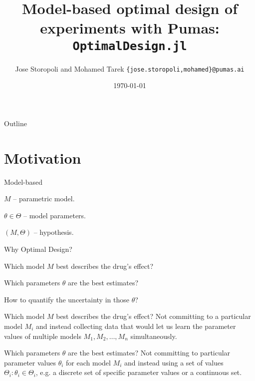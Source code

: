\documentclass[aspectratio=169]{beamer}                    %
\title[\texttt{OptimalDesign.jl}]{Model-based optimal design of experiments with Pumas: \texttt{OptimalDesign.jl}}
\author[\textcolor{pureminimalistic@text@pumasblue}{PumasAI}]{Jose Storopoli and Mohamed Tarek \texttt{\{jose.storopoli,mohamed\}@pumas.ai}}
\institute{\textcolor{pureminimalistic@text@pumasblue}{PumasAI}}
\date{\today}
\begin{document}
\maketitle
\nocite{*}

\begin{frame}{Outline}
	\tableofcontents
\end{frame}

\section{Motivation}
\begin{frame}{Model-based}
	\begin{vfilleditems}
		\item $M$ -- parametric model.
		\item $\theta \in \Theta$ -- model parameters.
		\item $(M, \Theta)$ -- hypothesis.
	\end{vfilleditems}
\end{frame}

\begin{frame}{Why Optimal Design?}
	\begin{vfilleditems}
		\item Which model $M$ best describes the drug's effect?
		\item Which parameters $\theta$ are the best estimates?
		\item How to quantify the uncertainty in those $\theta$?
	\end{vfilleditems}
\end{frame}

\begin{frame}{Which model $M$ best describes the drug's effect?}
	Not committing to a particular model $M_i$ and instead collecting data
	that would let us learn the parameter values of multiple models
	$M_1, M_2, \ldots , M_n$ simultaneously.
\end{frame}

\begin{frame}{Which parameters $\theta$ are the best estimates?}
	Not committing to particular parameter values $\theta_i$ for
	each model $M_i$ and instead using a set of values
	$\Theta_i: \theta_i \in \Theta_i$,
	e.g. a discrete set of specific parameter values or a continuous set.
\end{frame}
\end{document}
